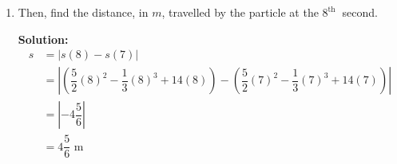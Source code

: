 \documentclass{report}
\newcommand{\sol}{\textbf{Solution:}}
\begin{document}
\begin{enumerate}[leftmargin=*]
\begin{enumerate}
\begin{enumerate}
                        \item the particle is insantaneously at rest.

                              \sol{}
                              \begin{align*}
                                  v          & = 0                                   \\
                                  5t-t^2+14  & = 0                                   \\
                                  t^2-5t-14  & = 0                                   \\
                                  (t-7)(t+2) & = 0                                   \\
                                  t= 7\      & \text{or}\ t = -2 \ (\text{rejected})
                              \end{align*}
                              When $t=7$,
                              \begin{align*}
                                  s & = \dfrac{5}{2}(7)^2 - \dfrac{1}{3}(7)^3 + 14(7) \\
                                    & \approx 106.17 \text{ m}
                              \end{align*}
                    \end{enumerate}

                    \newpage
              \item Then, find the distance, in $m$, travelled by the particle at the $8^{\text {th
                                }}$ second.

                    \sol{}
                    \begin{align*}
                        s & = \left|s(8) - s(7)\right|                                                                                                             \\
                          & = \left|\left(\dfrac{5}{2}(8)^2 - \dfrac{1}{3}(8)^3 + 14(8)\right) - \left(\dfrac{5}{2}(7)^2 - \dfrac{1}{3}(7)^3 + 14(7)\right)\right| \\
                          & = \left|-4\dfrac{5}{6}\right|                                                                                                          \\
                          & = 4\dfrac{5}{6} \text{ m}
                    \end{align*}
          \end{enumerate}


\end{enumerate}
\end{document}

